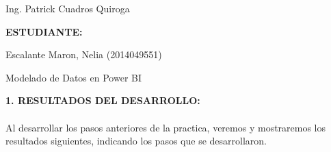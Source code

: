 \documentclass[12pt,letterpaper]{article}
\begin{document}
\begin{titlepage}
\begin{center}
\vspace*{0.1in}
\begin{large}
 Ing. Patrick Cuadros Quiroga\\
\end{large}

\vspace*{0.2in}
\vspace*{0.1in}
\begin{large}
\textbf{ESTUDIANTE:} \\
\vspace{\baselineskip}
\begin{flushleft}

Escalante Maron, Nelia 		\hfill	(2014049551) \\

\end{flushleft}
\end{large}
\end{center}

\end{titlepage}

\newpage

	\begin{center}
		\Large Modelado de Datos en Power BI
	\end{center}
	\vspace{\baselineskip}
	\vspace{\baselineskip}
	\textbf{\Large 1. RESULTADOS DEL DESARROLLO:}
	\\\\
Al desarrollar los pasos anteriores de la practica, veremos y mostraremos los resultados siguientes, indicando los pasos que se desarrollaron. \\\\
\end{document}
